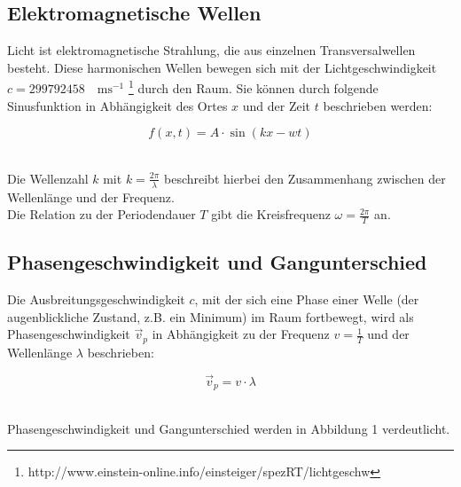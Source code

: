 \documentclass[12pt,a4paper,titlepage,headinclude,bibtotoc]{scrartcl}
\begin{document}
\subsection{Elektromagnetische Wellen}
Licht ist elektromagnetische Strahlung, die aus einzelnen Transversalwellen besteht. Diese harmonischen Wellen bewegen sich mit der Lichtgeschwindigkeit $c= 299 792 458\quad\mathrm{ms^{-1}}$ \footnote{http://www.einstein-online.info/einsteiger/spezRT/lichtgeschw} durch den Raum. Sie können durch folgende Sinusfunktion in Abhängigkeit des Ortes $x$ und der Zeit $t$ beschrieben werden:
\\
\par %
\begin{equation}
f(x,t)={ A}\cdot{\sin(kx-wt)}
\end{equation}
\\
\par

Die Wellenzahl $k$ mit $k=\frac{2\pi}{\lambda}$ beschreibt hierbei den Zusammenhang zwischen der Wellenlänge und der Frequenz. \\
Die Relation zu der Periodendauer $T$ gibt die Kreisfrequenz $\omega =\frac{2\pi}{T} $ an.  



\subsection{Phasengeschwindigkeit und Gangunterschied}
Die Ausbreitungsgeschwindigkeit $c$, mit der sich eine Phase einer Welle (der augenblickliche Zustand, z.B. ein Minimum) im Raum fortbewegt, wird als Phasengeschwindigkeit $\vec{v}_p$ in Abhängigkeit zu der Frequenz $v=\frac{1}{T}$ und der Wellenlänge $\lambda$ beschrieben:\\
\par
\begin{equation}
\vec{v}_p = {v}\cdot{\lambda}
\end{equation}
\\
\par

Phasengeschwindigkeit und Gangunterschied werden in Abbildung 1 verdeutlicht.
\end{document}
